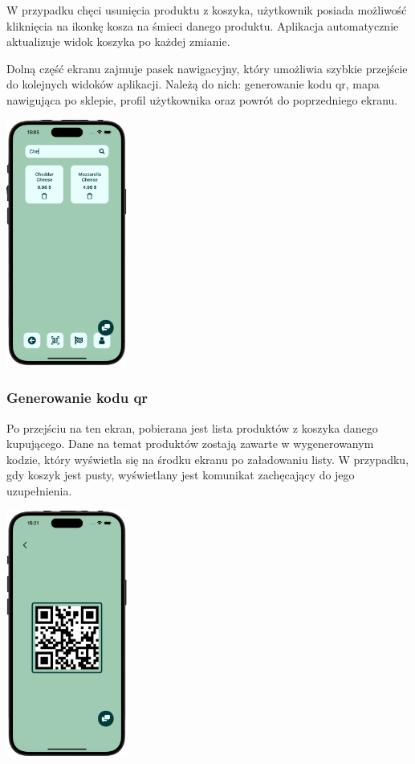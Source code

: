 W przypadku chęci usunięcia produktu z koszyka, użytkownik posiada możliwość kliknięcia na ikonkę kosza na śmieci danego produktu. Aplikacja automatycznie aktualizuje widok koszyka po każdej zmianie.

Dolną część ekranu zajmuje pasek nawigacyjny, który umożliwia szybkie przejście do kolejnych widoków aplikacji. Należą do nich: generowanie kodu qr, mapa nawigująca po sklepie, profil użytkownika oraz powrót do poprzedniego ekranu.

\begin{center}
    \includegraphics[width=0.3\textwidth]{images/front/cart_filtered.png}
\end{center}


\subsubsection{Generowanie kodu qr}

Po przejściu na ten ekran, pobierana jest lista produktów z koszyka danego kupującego. Dane na temat produktów zostają zawarte w wygenerowanym kodzie, który wyświetla się na środku ekranu po załadowaniu listy. W przypadku, gdy koszyk jest pusty, wyświetlany jest komunikat zachęcający do jego uzupełnienia. 

\begin{center}
    \includegraphics[width=0.3\textwidth]{images/front/qr_page.png}
\end{center}


